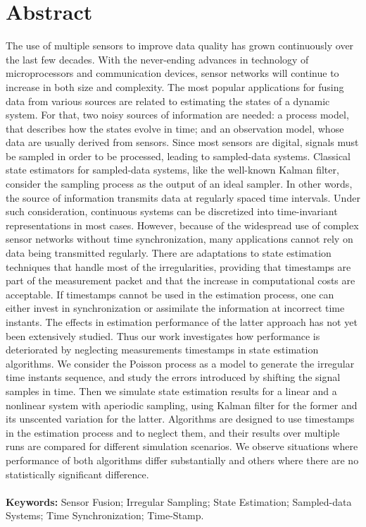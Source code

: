 \chapter*{Abstract}

\vspace{-2cm} The use of multiple sensors to improve data quality has grown continuously over the last few decades. With the never-ending advances in technology of microprocessors and communication devices, sensor networks will continue to increase in both size and complexity. The most popular applications for fusing data from various sources are related to estimating the states of a dynamic system. For that, two noisy sources of information are needed: a process model, that describes how the states evolve in time; and an observation model, whose data are usually derived from sensors. Since most sensors are digital, signals must be sampled in order to be processed, leading to sampled-data systems. Classical state estimators for sampled-data systems, like the well-known Kalman filter, consider the sampling process as the output of an ideal sampler. In other words, the source of information transmits data at regularly spaced time intervals. Under such consideration, continuous systems can be discretized into time-invariant representations in most cases. However, because of the widespread use of complex sensor networks without time synchronization, many applications cannot rely on data being transmitted regularly. There are adaptations to state estimation techniques that handle most of the irregularities, providing that timestamps are part of the measurement packet and that the increase in computational costs are acceptable. If timestamps cannot be used in the estimation process, one can either invest in synchronization or assimilate the information at incorrect time instants. The effects in estimation performance of the latter approach has not yet been extensively studied. Thus our work investigates how performance is deteriorated by neglecting measurements timestamps in state estimation algorithms. We consider the Poisson process as a model to generate the irregular time instants sequence, and study the errors introduced by shifting the signal samples in time. Then we simulate state estimation results for a linear and a nonlinear system with aperiodic sampling, using Kalman filter for the former and its unscented variation for the latter. Algorithms are designed to use timestamps in the estimation process and to neglect them, and their results over multiple runs are compared for different simulation scenarios. We observe situations where performance of both algorithms differ substantially and others where there are no statistically significant difference. 
\\ \\
\textbf{Keywords:} Sensor Fusion; Irregular Sampling; State Estimation; Sampled-data Systems; Time Synchronization; Time-Stamp.

